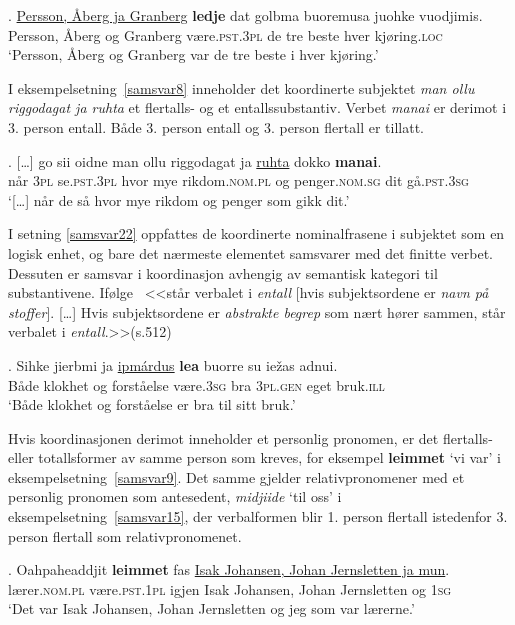 \documentclass{flammie}
\begin{document}
\exg. \underline{Persson, Åberg ja Granberg} \textbf{ledje} dat golbma buoremusa juohke vuodjimis.\label{samsvar7}\\
{Persson, Åberg og Granberg} være\textsc{.pst.3pl} de tre beste hver kjøring\textsc{.loc}\\
`Persson, Åberg og Granberg {var} de tre beste i hver kjøring.'

I eksempelsetning~\ref{samsvar8} inneholder det koordinerte subjektet
\textit{man ollu riggodagat ja ruhta} et flertalls- og et entallssubstantiv.
Verbet \textit{manai} er derimot i 3. person entall. Både 3. person entall og 3.
person flertall er tillatt.

\exg. [\ldots] go sii oidne man ollu riggodagat ja \underline{ruhta} dokko \textbf{manai}.\label{samsvar8}\\
[\ldots] når \textsc{3pl} se\textsc{.pst.3pl} hvor mye rikdom\textsc{.nom.pl} og penger\textsc{.nom.sg} dit gå\textsc{.pst.3sg}\\
`[\ldots] når de så hvor mye rikdom og penger som gikk dit.'

I setning \ref{samsvar22} oppfattes de koordinerte nominalfrasene i subjektet
som en logisk enhet, og bare det nærmeste elementet samsvarer med det finitte
verbet. Dessuten er samsvar i koordinasjon avhengig av semantisk kategori til
substantivene. Ifølge~\cite{Nickel1994} <<står verbalet i \textit{entall} [hvis
subjektsordene er \textit{navn på stoffer}]. [\ldots] Hvis subjektsordene er
\textit{abstrakte begrep} som nært hører sammen, står verbalet i
\textit{entall}.>>(s.512)

\exg. Sihke jierbmi ja \underline{ipmárdus} \textbf{lea} buorre su iežas adnui.\label{samsvar22}\\
Både klokhet og forståelse være\textsc{.3sg} bra \textsc{3pl.gen} eget  bruk\textsc{.ill}\\
`Både klokhet og forståelse er bra til sitt bruk.'

Hvis koordinasjonen derimot inneholder et personlig pronomen, er det flertalls-
eller totallsformer av samme person som kreves, for eksempel \textbf{leimmet}
`vi var' i eksempelsetning~\ref{samsvar9}. Det samme gjelder relativpronomener
med et personlig pronomen som antesedent, \textit{midjiide} `til oss' i
eksempelsetning~\ref{samsvar15}, der verbalformen blir 1. person flertall
istedenfor 3. person flertall som relativpronomenet.


\exg. Oahpaheaddjit \textbf{leimmet} fas \underline{Isak Johansen, Johan Jernsletten ja mun}.\label{samsvar9}\\
lærer\textsc{.nom.pl} være\textsc{.pst.1pl} igjen {Isak Johansen, Johan Jernsletten og \textsc{1sg}}\\
`Det {var} Isak Johansen, Johan Jernsletten og jeg som var lærerne.'
\end{document}
